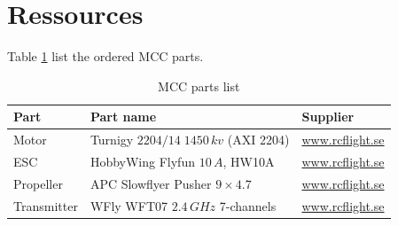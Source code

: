 \section{Ressources}
%
Table \ref{tab:mcc_parts_list} list the ordered \ac{MCC} parts.
\begin{table}[bht]
\centering
\caption{MCC parts list}
\begin{tabular}{l l l}
\hline
\textbf{Part} &  \textbf{Part name} & \textbf{Supplier}\\ 
\hline
Motor & Turnigy $2204/14\;1450\,kv$ (AXI 2204) & \url{www.rcflight.se} \\
ESC & HobbyWing Flyfun $10\,A$, HW10A & \url{www.rcflight.se}\\
Propeller & APC Slowflyer Pusher $9 \times 4.7$ & \url{www.rcflight.se}\\
Transmitter & WFly WFT07 $2.4\,GHz$ 7-channels & \url{www.rcflight.se}\\
\hline
\end{tabular}
\label{tab:mcc_parts_list}
\end{table}
%